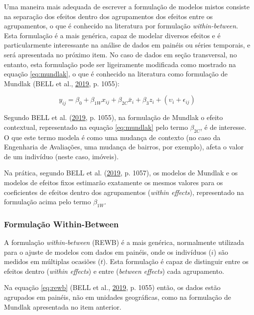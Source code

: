 \documentclass[
  a4paper, 12pt]{article}
\begin{document}
Uma maneira mais adequada de escrever a formulação de modelos mistos
consiste na separação dos efeitos dentro dos agrupamentos dos efeitos
entre os agrupamentos, o que é conhecido na literatura por formulação
\emph{within-between}. Esta formulação é a mais genérica, capaz de
modelar diversos efeitos e é particularmente interessante na análise de
dados em painéis ou séries temporais, e será apresentada no próximo
item. No caso de dados em seção transversal, no entanto, esta formulação
pode ser ligeiramente modificada como mostrado na equação
\ref{eq:mundlak}, o que é conhecido na literatura como formulação de
Mundlak (BELL et al., \protect\hyperlink{ref-bell2019}{2019}, p. 1055):

\begin{equation} \label{eq:mundlak}
y_{ij} = \beta_0 + \beta_{1W} x_{ij} + \beta_{2C}\bar{x}_i+ \beta_3 z_i + (\upsilon_i + \epsilon_{ij}) 
\end{equation}

Segundo BELL et al. (\protect\hyperlink{ref-bell2019}{2019}, p. 1055),
na formulação de Mundlak o efeito contextual, representado na equação
\ref{eq:mundlak} pelo termo \(\beta_{2C}\), é de interesse. O que este
termo modela é como uma mudança de contexto (no caso da Engenharia de
Avaliações, uma mudança de bairros, por exemplo), afeta o valor de um
indivíduo (neste caso, imóveis).

Na prática, segundo BELL et al. (\protect\hyperlink{ref-bell2019}{2019},
p. 1057), os modelos de Mundlak e os modelos de efeitos fixos estimarão
exatamente os mesmos valores para os coeficientes de efeitos dentro dos
agrupamentos (\emph{within effects}), representado na formulação acima
pelo termo \(\beta_{1W}\).

\hypertarget{formulauxe7uxe3o-within-between}{%
\subsubsection{Formulação
Within-Between}\label{formulauxe7uxe3o-within-between}}

A formulação \emph{within-between} (REWB) é a mais genérica, normalmente
utilizada para o ajuste de modelos com dados em painéis, onde os
indivíduos (\(i\)) são medidos em múltiplas ocasiões (\(t\)). Esta
formulação é capaz de distinguir entre os efeitos dentro (\emph{within
effects}) e entre (\emph{between effects}) cada agrupamento.

Na equação \ref{eq:rewb} (BELL et al.,
\protect\hyperlink{ref-bell2019}{2019}, p. 1055) então, os dados estão
agrupados em painéis, não em unidades geográficas, como na formulação de
Mundlak apresentada no item anterior.
\end{document}
